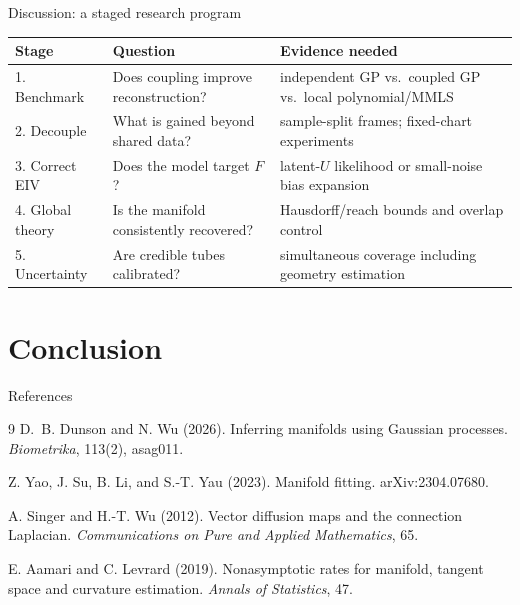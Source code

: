 \documentclass[aspectratio=169,10pt]{beamer}
\begin{document}
\begin{frame}{Discussion: a staged research program}
  \begin{center}
    \begin{tabular}{p{}p{}p{}}
      \toprule
      Stage & Question & Evidence needed\\
      \midrule
      1. Benchmark & Does coupling improve reconstruction? &
        independent GP vs.\ coupled GP vs.\ local polynomial/MMLS\\
      2. Decouple & What is gained beyond shared data? &
        sample-split frames; fixed-chart experiments\\
      3. Correct EIV & Does the model target \(F\)? &
        latent-\(U\) likelihood or small-noise bias expansion\\
      4. Global theory & Is the manifold consistently recovered? &
        Hausdorff/reach bounds and overlap control\\
      5. Uncertainty & Are credible tubes calibrated? &
        simultaneous coverage including geometry estimation\\
      \bottomrule
    \end{tabular}
  \end{center}
\end{frame}

\section{Conclusion}


\begin{frame}{References}
  \small
  \begin{thebibliography}{9}
      D.~B. Dunson and N. Wu (2026).
      \newblock Inferring manifolds using Gaussian processes.
      \newblock \emph{Biometrika}, 113(2), asag011.

      Z. Yao, J. Su, B. Li, and S.-T. Yau (2023).
      \newblock Manifold fitting.
      \newblock arXiv:2304.07680.

      A. Singer and H.-T. Wu (2012).
      \newblock Vector diffusion maps and the connection Laplacian.
      \newblock \emph{Communications on Pure and Applied Mathematics}, 65.

      E. Aamari and C. Levrard (2019).
      \newblock Nonasymptotic rates for manifold, tangent space and curvature estimation.
      \newblock \emph{Annals of Statistics}, 47.
  \end{thebibliography}
\end{frame}
\end{document}
